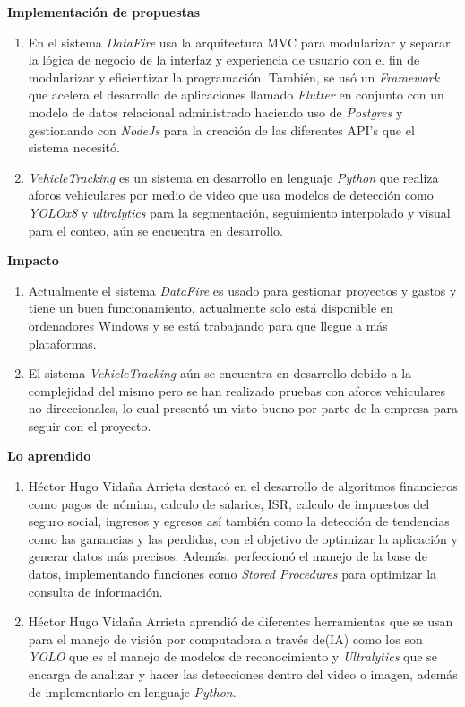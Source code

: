 \documentclass[protocolo.tex]{subfiles}
\begin{document}
\textbf{Implementación de propuestas}
\begin{enumerate}
\item En el sistema \textit{DataFire} usa la arquitectura MVC para modularizar y separar la lógica de negocio de la interfaz y experiencia de usuario con el fin de modularizar y eficientizar la programación. También, se usó un \textit{Framework} que acelera el desarrollo de aplicaciones llamado \textit{Flutter} en conjunto con un modelo de datos relacional administrado haciendo uso de \textit{Postgres} y gestionando con \textit{NodeJs} para la creación de las diferentes API’s que el sistema necesitó.
\item \textit{VehicleTracking} es un sistema en desarrollo en lenguaje \textit{Python} que realiza aforos vehiculares por medio de video que usa modelos de detección como \textit{YOLOx8} y \textit{ultralytics} para la segmentación, seguimiento interpolado y visual para el conteo, aún se encuentra en desarrollo.\vspace{5mm} 
\end{enumerate}

\textbf{Impacto}
\begin{enumerate}
\item Actualmente el sistema \textit{DataFire} es usado para gestionar proyectos y gastos y tiene un buen funcionamiento, actualmente solo está disponible en ordenadores Windows y se está trabajando para que llegue a más plataformas.
\item El sistema \textit{VehicleTracking} aún se encuentra en desarrollo debido a la complejidad del mismo pero se han realizado pruebas con aforos vehiculares no direccionales, lo cual presentó un visto bueno por parte de la empresa para seguir con el proyecto.
\end{enumerate}

\textbf{Lo aprendido}
\begin{enumerate}
\item Héctor Hugo Vidaña Arrieta destacó en el desarrollo de algoritmos financieros como pagos de nómina, calculo de salarios, ISR, calculo de impuestos del seguro social, ingresos y egresos así también como la detección de tendencias como las ganancias y las perdidas, con el objetivo de optimizar la aplicación y generar datos más precisos. Además,  perfeccionó el manejo de la base de datos, implementando funciones como \textit{Stored Procedures} para optimizar la consulta de información.

\item Héctor Hugo Vidaña Arrieta aprendió de diferentes herramientas que se usan para el manejo de visión por computadora a través de(IA) como los son \textit{YOLO} que es el manejo de modelos de reconocimiento y \textit{Ultralytics} que se encarga de analizar y hacer las detecciones dentro del video o imagen, además de implementarlo en lenguaje \textit{Python}.
\end{enumerate}
\end{document}
